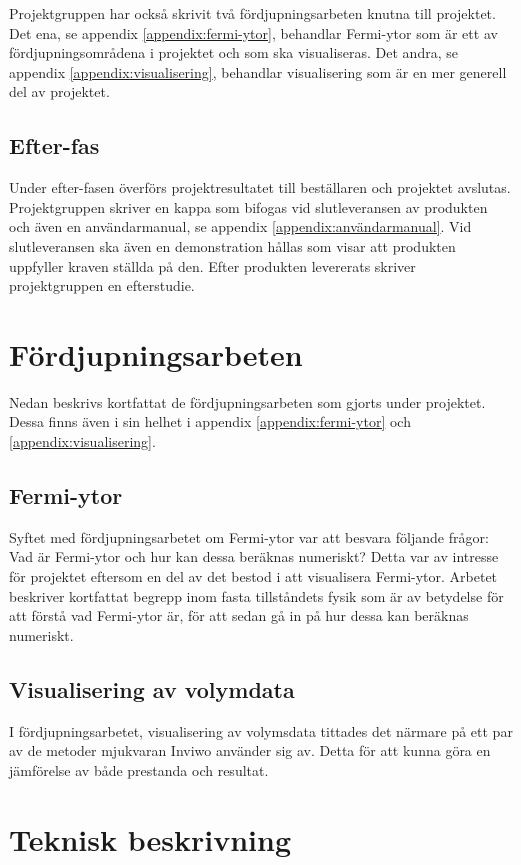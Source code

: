 \documentclass[a4paper,12pt]{article}
\begin{document}
Projektgruppen har också skrivit två fördjupningsarbeten knutna till projektet. Det ena, se appendix \ref{appendix:fermi-ytor}, behandlar Fermi-ytor som är ett av fördjupningsområdena i projektet och som ska visualiseras. Det andra, se appendix \ref{appendix:visualisering}, behandlar visualisering som är en mer generell del av projektet. 

\subsection{Efter-fas}
Under efter-fasen överförs projektresultatet till beställaren och projektet avslutas. Projektgruppen skriver en kappa som bifogas vid slutleveransen av produkten och även en användarmanual, se appendix \ref{appendix:användarmanual}. Vid slutleveransen ska
även en demonstration hållas som visar att produkten uppfyller kraven ställda på den. Efter produkten levererats skriver projektgruppen en efterstudie.

\section{Fördjupningsarbeten}
\label{ch:fördjupningsarbeten}
Nedan beskrivs kortfattat de fördjupningsarbeten som gjorts under projektet. Dessa finns även i sin helhet i appendix \ref{appendix:fermi-ytor} och \ref{appendix:visualisering}. 
\subsection{Fermi-ytor}
Syftet med fördjupningsarbetet om Fermi-ytor var att besvara följande frågor: Vad är Fermi-ytor och hur kan dessa beräknas numeriskt? Detta var av intresse för projektet eftersom en del av det bestod i att visualisera Fermi-ytor. Arbetet beskriver kortfattat begrepp inom fasta tillståndets fysik som är av betydelse för att förstå vad Fermi-ytor är, för att sedan gå in på hur dessa kan beräknas numeriskt.

\subsection{Visualisering av volymdata}
I fördjupningsarbetet, visualisering av volymsdata tittades det närmare på ett par av de metoder mjukvaran Inviwo använder sig av. Detta för att kunna göra en jämförelse av både prestanda och resultat.
\section{Teknisk beskrivning}
\label{ch:teknisk-beskrivning}
\end{document}
